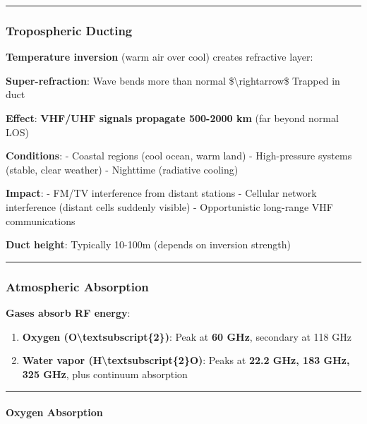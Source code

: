 \begin{center}\rule{0.5\linewidth}{0.5pt}\end{center}

\subsubsection{Tropospheric Ducting}\label{tropospheric-ducting}

\textbf{Temperature inversion} (warm air over cool) creates refractive
layer:

\textbf{Super-refraction}: Wave bends more than normal
\$\textbackslash rightarrow\$ Trapped in duct

\textbf{Effect}: \textbf{VHF/UHF signals propagate 500-2000 km} (far
beyond normal LOS)

\textbf{Conditions}: - Coastal regions (cool ocean, warm land) -
High-pressure systems (stable, clear weather) - Nighttime (radiative
cooling)

\textbf{Impact}: - FM/TV interference from distant stations - Cellular
network interference (distant cells suddenly visible) - Opportunistic
long-range VHF communications

\textbf{Duct height}: Typically 10-100m (depends on inversion strength)

\begin{center}\rule{0.5\linewidth}{0.5pt}\end{center}

\subsubsection{Atmospheric Absorption}\label{atmospheric-absorption}

\textbf{Gases absorb RF energy}:

\begin{enumerate}
\def\labelenumi{\arabic{enumi}.}
\tightlist
\item
  \textbf{Oxygen (O\textbackslash textsubscript\{2\})}: Peak at
  \textbf{60 GHz}, secondary at 118 GHz
\item
  \textbf{Water vapor (H\textbackslash textsubscript\{2\}O)}: Peaks at
  \textbf{22.2 GHz, 183 GHz, 325 GHz}, plus continuum absorption
\end{enumerate}

\begin{center}\rule{0.5\linewidth}{0.5pt}\end{center}

\paragraph{Oxygen Absorption}\label{oxygen-absorption}

